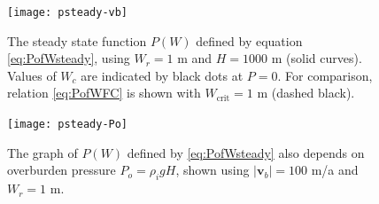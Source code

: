 \documentclass[gmd]{copernicus}   %
\newcommand{\text}{\textrm}
\newcommand\bv{\mathbf{v}}
\begin{document}
\begin{figure}[ht]
\texttt{[image: psteady-vb]}
\caption{The steady state function $P(W)$ defined by equation \eqref{eq:PofWsteady}, using $W_r=1$ m and $H=1000$ m (solid curves).  Values of $W_c$ are indicated by black dots at $P=0$.  For comparison, \cite{FlowersClarke2002_theory} relation \eqref{eq:PofWFC} is shown with $W_{\text{crit}}=1$ m (dashed black).}
\label{fig:psteady-vb}
\end{figure}

\begin{figure}[ht]
\texttt{[image: psteady-Po]}
\caption{The graph of $P(W)$ defined by \eqref{eq:PofWsteady} also depends on overburden pressure $P_o=\rho_i g H$, shown using $|\bv_b|=100$ m/a and $W_r=1$ m.}
\label{fig:psteady-Po}
\end{figure}
\end{document}
